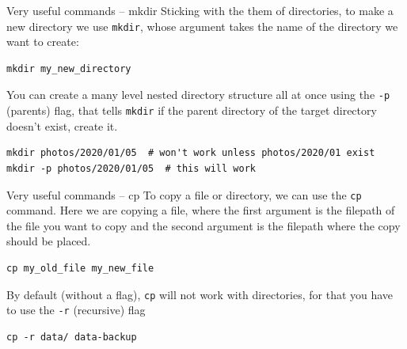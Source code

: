 \documentclass[10pt]{beamer}
\begin{document}
\begin{frame}[label={sec:org827b1a7},fragile]{Very useful commands -- mkdir}
 Sticking with the them of directories, to make a new directory we use \texttt{mkdir},
whose argument takes the name of the directory we want to create:

\begin{verbatim}
mkdir my_new_directory
\end{verbatim}

You can create a many level nested directory structure all at once using the \texttt{-p}
(parents) flag, that tells \texttt{mkdir} if the parent directory of the target directory
doesn't exist, create it.

\begin{verbatim}
mkdir photos/2020/01/05  # won't work unless photos/2020/01 exist
mkdir -p photos/2020/01/05  # this will work
\end{verbatim}
\end{frame}

\begin{frame}[label={sec:org8053f50},fragile]{Very useful commands -- cp}
 To copy a file or directory, we can use the \texttt{cp} command. Here we are copying a
file, where the first argument is the filepath of the file you want to copy and the second
argument is the filepath where the copy should be placed.

\begin{verbatim}
cp my_old_file my_new_file
\end{verbatim}

By default (without a flag), \texttt{cp} will not work with directories, for that you
have to use the \texttt{-r} (recursive) flag

\begin{verbatim}
cp -r data/ data-backup
\end{verbatim}
\end{frame}
\end{document}
